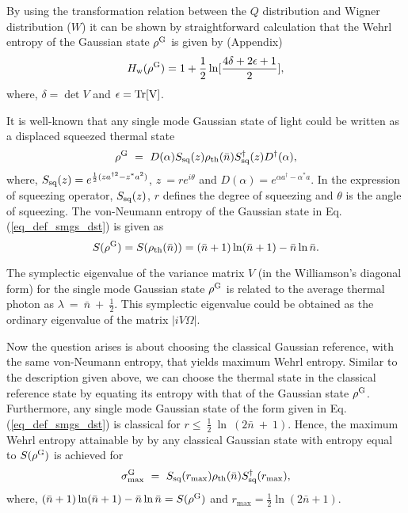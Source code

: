 \documentclass[letter,scriptaddress,twocolumn,prl,showkeys]{revtex4}
\begin{document}
By using the transformation relation between the $Q$ distribution and Wigner distribution ($W$) it can be shown by straightforward calculation that the Wehrl entropy of the Gaussian state $\rho^{\rm{G}}$ is given by (Appendix)
\begin{equation}
H_{\rm{w}}(\rho^{\rm{G}})=1+\frac{1}{2}\ln[\frac{4\delta+2\epsilon+1}{2}],
\label{eq_we_gauss}
\end{equation}
where, $\delta=\det V$ and $\epsilon=\rm{Tr}[V]$.

It is well-known that any single mode Gaussian state of light could be written as a displaced squeezed thermal state \cite{smgs_dst_chaturvedi}
\begin{equation}
\rho^{\rm{G}}~=~D(\alpha)S_{\rm{sq}}(z)\rho_{\rm{th}}(\bar{n})S^{\dagger}_{\rm{sq}}(z)D^{\dagger}(\alpha),
\label{eq_def_smgs_dst}
\end{equation}
where, $S_{\rm{sq}}(z)=e^{\frac{1}{2}(z a^{\dagger 2}-z^{*}a^{2})}$, $z~=re^{i\theta}$ and $D(\alpha)=e^{\alpha a^{\dagger}-\alpha^{*}a}$.
In the expression of squeezing operator, $S_{\rm{sq}}(z)$, $r$ defines the degree of squeezing and $\theta$ is the angle of squeezing.
The von-Neumann entropy of the Gaussian state in Eq. (\ref{eq_def_smgs_dst}) is given as \cite{varmat_simon, entropy_gauss_illuminati}
\begin{equation}
S(\rho^{\rm{G}})=S(\rho_{\rm{th}}(\bar{n}))=(\bar{n}+1)\ln(\bar{n}+1)-\bar{n}\ln\bar{n}.
\label{eq_gauss_entropy}
\end{equation}

The symplectic eigenvalue of the variance matrix $V$ (in the Williamson's diagonal form) for the single mode Gaussian state $\rho^{\rm{G}}$ is related to the average thermal photon as $\lambda~=~\bar{n}~+~\frac{1}{2}$.
This symplectic eigenvalue could be obtained as the ordinary eigenvalue of the matrix $|i V\Omega|$.

Now the question arises is about choosing the classical Gaussian reference, with the same von-Neumann entropy, that yields maximum Wehrl entropy. 
Similar to the description given above, we can choose the thermal state in the classical reference state by equating its entropy with that of the Gaussian state $\rho^{\rm{G}}$. 
Furthermore, any single mode Gaussian state of the form given in Eq. (\ref{eq_def_smgs_dst}) is classical for $r\leq~\frac{1}{2}~\ln~(2\bar{n}~+~1)$. 
Hence, the maximum Wehrl entropy attainable by by any classical Gaussian state with entropy equal to $S(\rho^{\rm{G}})$ is achieved for
\begin{equation}
\sigma^{\rm{G}}_{\max}~=~S_{\rm{sq}}(r_{\max})\rho_{\rm{th}}(\bar{n})S^{\dagger}_{\rm{sq}}(r_{\max}),
\label{eq_def_gauss_cls_ref}
\end{equation}
where, $(\bar{n}+1)\ln(\bar{n}+1)-\bar{n}\ln\bar{n}=S(\rho^{\rm{G}})$ and $r_{\max}=\frac{1}{2}\ln(2\bar{n}+1)$.
\end{document}
